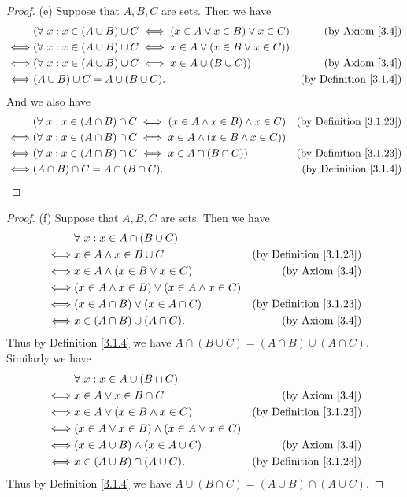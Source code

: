 \begin{proof}{(e)}
Suppose that \(A, B, C\) are sets.
Then we have
\begin{align*}
& (\forall\ x : x \in (A \cup B) \cup C \iff (x \in A \lor x \in B) \lor x \in C) & \text{(by Axiom \ref{3.4})} \\
\iff & (\forall\ x : x \in (A \cup B) \cup C \iff x \in A \lor (x \in B \lor x \in C)) \\
\iff & (\forall\ x : x \in (A \cup B) \cup C \iff x \in A \cup (B \cup C)) & \text{(by Axiom \ref{3.4})} \\
\iff & (A \cup B) \cup C = A \cup (B \cup C). & \text{(by Definition \ref{3.1.4})}
\end{align*}
And we also have
\begin{align*}
& (\forall\ x : x \in (A \cap B) \cap C \iff (x \in A \land x \in B) \land x \in C) & \text{(by Definition \ref{3.1.23})} \\
\iff & (\forall\ x : x \in (A \cap B) \cap C \iff x \in A \land (x \in B \land x \in C)) \\
\iff & (\forall\ x : x \in (A \cap B) \cap C \iff x \in A \cap (B \cap C)) & \text{(by Definition \ref{3.1.23})} \\
\iff & (A \cap B) \cap C = A \cap (B \cap C). & \text{(by Definition \ref{3.1.4})}
\end{align*}
\end{proof}

\begin{proof}{(f)}
Suppose that \(A, B, C\) are sets.
Then we have
\begin{align*}
& \forall\ x : x \in A \cap (B \cup C) \\
\iff & x \in A \land x \in B \cup C & \text{(by Definition \ref{3.1.23})} \\
\iff & x \in A \land (x \in B \lor x \in C) & \text{(by Axiom \ref{3.4})} \\
\iff & (x \in A \land x \in B) \lor (x \in A \land x \in C) \\
\iff & (x \in A \cap B) \lor (x \in A \cap C) & \text{(by Definition \ref{3.1.23})} \\
\iff & x \in (A \cap B) \cup (A \cap C). & \text{(by Axiom \ref{3.4})}
\end{align*}
Thus by Definition \ref{3.1.4} we have \(A \cap (B \cup C) = (A \cap B) \cup (A \cap C)\).
Similarly we have
\begin{align*}
& \forall\ x : x \in A \cup (B \cap C) \\
\iff & x \in A \lor x \in B \cap C & \text{(by Axiom \ref{3.4})} \\
\iff & x \in A \lor (x \in B \land x \in C) & \text{(by Definition \ref{3.1.23})} \\
\iff & (x \in A \lor x \in B) \land (x \in A \lor x \in C) \\
\iff & (x \in A \cup B) \land (x \in A \cup C) & \text{(by Axiom \ref{3.4})} \\
\iff & x \in (A \cup B) \cap (A \cup C). & \text{(by Definition \ref{3.1.23})}
\end{align*}
Thus by Definition \ref{3.1.4} we have \(A \cup (B \cap C) = (A \cup B) \cap (A \cup C)\).
\end{proof}

